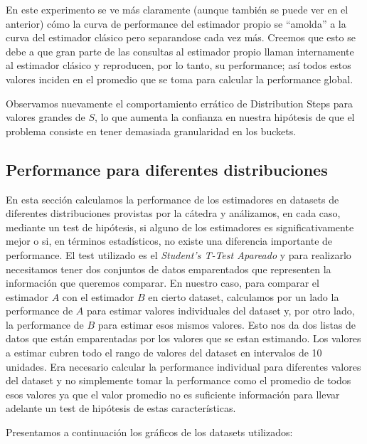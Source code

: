 En este experimento se ve más claramente (aunque también se puede ver en el anterior) cómo la curva de performance del estimador propio se ``amolda'' a la curva del estimador clásico pero separandose cada vez más. Creemos que esto se debe a que gran parte de las consultas al estimador propio llaman internamente al estimador clásico y reproducen, por lo tanto, su performance; así todos estos valores inciden en el promedio que se toma para calcular la performance global.

Observamos nuevamente el comportamiento errático de Distribution Steps para valores grandes de $S$, lo que aumenta la confianza en nuestra hipótesis de que el problema consiste en tener demasiada granularidad en los buckets.

\subsection{Performance para diferentes distribuciones}
En esta sección calculamos la performance de los estimadores en datasets de diferentes distribuciones provistas por la cátedra y análizamos, en cada caso, mediante un test de hipótesis, si alguno de los estimadores es significativamente mejor o si, en términos estadísticos, no existe una diferencia importante de performance. 
El test utilizado es el \textit{Student’s T-Test Apareado} y para realizarlo necesitamos tener dos conjuntos de datos emparentados que representen la información que queremos comparar. En nuestro caso, para comparar el estimador $A$ con el estimador $B$ en cierto dataset, calculamos por un lado la performance de $A$ para estimar valores individuales del dataset y, por otro lado, la performance de $B$ para estimar esos mismos valores. Esto nos da dos listas de datos que están emparentadas por los valores que se estan estimando. Los valores a estimar cubren todo el rango de valores del dataset en intervalos de 10 unidades. Era necesario calcular la performance individual para diferentes valores del dataset y no simplemente tomar la performance como el promedio de todos esos valores ya que el valor promedio no es suficiente información para llevar adelante un test de hipótesis de estas características.

Presentamos a continuación los gráficos de los datasets utilizados:

